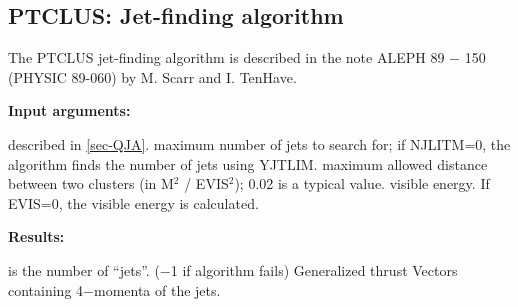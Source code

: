 \subsection{\label{sec-QJPT}PTCLUS: Jet-finding algorithm}
\par
{}
\par
\par
The PTCLUS jet-finding algorithm is described in the note ALEPH 89 $-$ 150 (PHYSIC 89-060) by M. Scarr and I. TenHave.
\par
{\bf Input arguments:}
\begin{indentlist}{ 2.50cm}{ 2.75cm}
described in \ref{sec-QJA}.
maximum number of jets to search for; if NJLITM=0,
the algorithm finds the number of jets using YJTLIM.
maximum allowed distance between two clusters
(in M$^2$ / EVIS$^2$); 0.02 is a typical value.
visible energy.  If EVIS=0, the visible energy is
calculated.
\end{indentlist}
 
{\bf Results:}
\begin{indentlist}{ 2.50cm}{ 2.75cm}
 is the number of ``jets''. ($-$1 if algorithm fails)
Generalized thrust
Vectors containing 4$-$momenta of the jets.
\end{indentlist}

